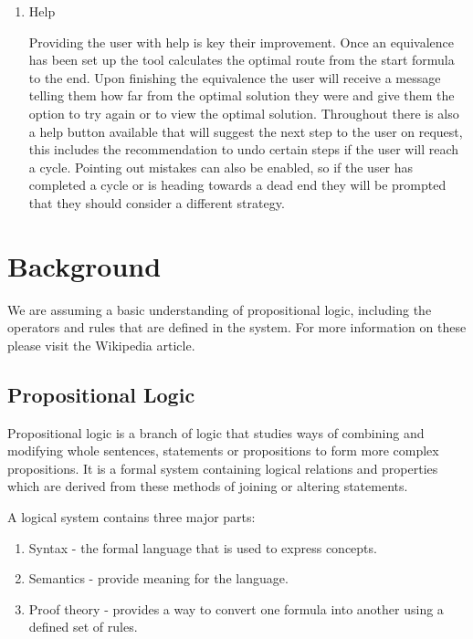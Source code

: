 \documentclass{report}
\begin{document}
\begin{enumerate}
\item Help

Providing the user with help is key their improvement. Once an equivalence has been set up the tool calculates the optimal route from the start formula to the end. Upon finishing the equivalence the user will receive a message telling them how far from the optimal solution they were and give them the option to try again or to view the optimal solution. Throughout there is also a help button available that will suggest the next step to the user on request, this includes the recommendation to undo certain steps if the user will reach a cycle. Pointing out mistakes can also be enabled, so if the user has completed a cycle or is heading towards a dead end they will be prompted that they should consider a different strategy.

\end{enumerate}


\chapter{Background}

We are assuming a basic understanding of propositional logic, including the operators and rules that are defined in the system. For more information on these please visit the Wikipedia article\cite{propositionalwiki}.

\section{Propositional Logic}

Propositional logic is a branch of logic that studies ways of combining and modifying whole sentences, statements or propositions to form more complex propositions. It is a formal system containing logical relations and properties which are derived from these methods of joining or altering statements.

A logical system contains three major parts:

\begin{enumerate}
\item Syntax - the formal language that is used to express concepts.
\item Semantics - provide meaning for the language.
\item Proof theory - provides a way to convert one formula into another using a defined set of rules.
\end{enumerate}
\end{document}
